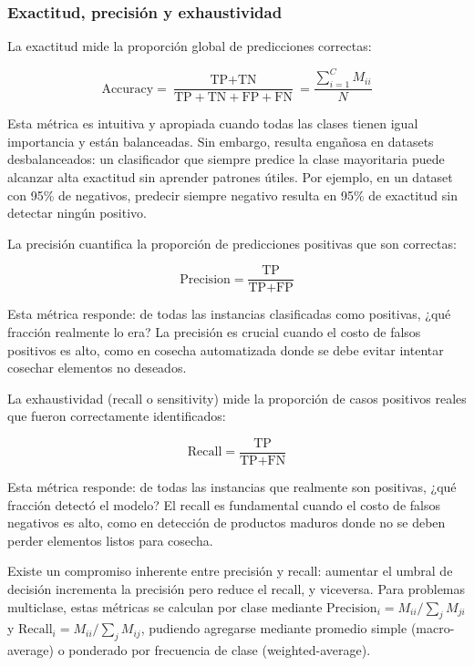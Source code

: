 \subsubsection{Exactitud, precisión y exhaustividad}

La exactitud mide la proporción global de predicciones correctas:

\begin{equation}
\text{Accuracy} = \frac{\text{TP} + \text{TN}}{\text{TP} + \text{TN} + \text{FP} + \text{FN}} = \frac{\sum_{i=1}^{C} M_{ii}}{N}
\end{equation}

Esta métrica es intuitiva y apropiada cuando todas las clases tienen igual importancia y están balanceadas. Sin embargo, resulta engañosa en datasets desbalanceados: un clasificador que siempre predice la clase mayoritaria puede alcanzar alta exactitud sin aprender patrones útiles. Por ejemplo, en un dataset con 95\% de negativos, predecir siempre negativo resulta en 95\% de exactitud sin detectar ningún positivo.

La precisión cuantifica la proporción de predicciones positivas que son correctas:

\begin{equation}
\text{Precision} = \frac{\text{TP}}{\text{TP} + \text{FP}}
\end{equation}

Esta métrica responde: de todas las instancias clasificadas como positivas, ¿qué fracción realmente lo era? La precisión es crucial cuando el costo de falsos positivos es alto, como en cosecha automatizada donde se debe evitar intentar cosechar elementos no deseados.

La exhaustividad (recall o sensitivity) mide la proporción de casos positivos reales que fueron correctamente identificados:

\begin{equation}
\text{Recall} = \frac{\text{TP}}{\text{TP} + \text{FN}}
\end{equation}

Esta métrica responde: de todas las instancias que realmente son positivas, ¿qué fracción detectó el modelo? El recall es fundamental cuando el costo de falsos negativos es alto, como en detección de productos maduros donde no se deben perder elementos listos para cosecha.

Existe un compromiso inherente entre precisión y recall: aumentar el umbral de decisión incrementa la precisión pero reduce el recall, y viceversa. Para problemas multiclase, estas métricas se calculan por clase mediante $\text{Precision}_i = M_{ii}/\sum_{j} M_{ji}$ y $\text{Recall}_i = M_{ii}/\sum_{j} M_{ij}$, pudiendo agregarse mediante promedio simple (macro-average) o ponderado por frecuencia de clase (weighted-average).

